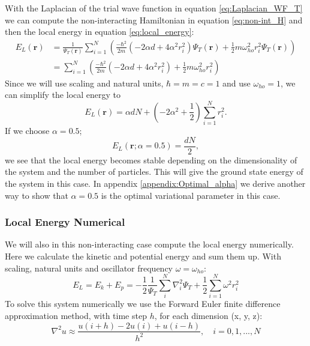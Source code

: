 \documentclass[12pt,a4paper,english]{article}
\begin{document}
With the Laplacian of the trial wave function in equation \ref{eq:Laplacian_WF_T} we can compute the non-interacting Hamiltonian in equation \ref{eq:non-int_H} and then the local energy in equation \ref{eq:local_energy}:
\begin{align*}
E_L(\textbf{r})&=\frac{1}{\Psi_T(\textbf{r})}\sum_{i=1}^{N}\left(\frac{-\hbar^2}{2m}(-2\alpha d+4\alpha^2r_i^2)\Psi_T(\textbf{r})+\frac{1}{2}m\omega_{ho}^2r_i^2\Psi_T(\textbf{r})\right)\nonumber\\
&=\sum_{i=1}^{N}\left(\frac{-\hbar^2}{2m}(-2\alpha d+4\alpha^2r_i^2)+\frac{1}{2}m\omega_{ho}^2r_i^2\right)
\end{align*}
Since we will use scaling and natural units, $\hbar=m=c=1$ and use $\omega_{ho}=1$, we can simplify the local energy to
\begin{equation}
\label{eq:local_E_nonint}
E_L(\textbf{r})=\alpha dN+(-2\alpha^2+\frac{1}{2})\sum_{i=1}^{N}r_i^2.
\end{equation}
If we choose $\alpha=0.5$; 
\begin{equation}
\label{eq:local_E_stable}
E_L(\textbf{r};\alpha=0.5)=\frac{dN}{2},
\end{equation}
we see that the local energy becomes stable depending on the dimensionality of the system and the number of particles. This will give the ground state energy of the system in this case. In appendix \ref{appendix:Optimal_alpha} we derive another way to show that $\alpha=0.5$ is the optimal variational parameter in this case.

\subsubsection{Local Energy Numerical}
\label{subsubsect:EL_num}
We will also in this non-interacting case compute the local energy numerically. Here we calculate the kinetic and potential energy and sum them up. With scaling, natural units and oscillator frequency $\omega=\omega_{ho}$:
\begin{equation}
\label{eq:local_E_num}
E_L=E_k+E_p=-\frac{1}{2}\frac{1}{\Psi_T}\sum_i^{N}\nabla_i^2\Psi_T+\frac{1}{2}\sum_{i=1}^{N}\omega^2r_i^2
\end{equation}
To solve this system numerically we use the Forward Euler finite difference approximation method, with time step $h$, for each dimension (x, y, z):
\begin{equation*}
\nabla^2 u\approx \frac{u(i+h)-2u(i)+u(i-h)}{h^2},\quad i=0,1,...,N
\end{equation*}
\end{document}
